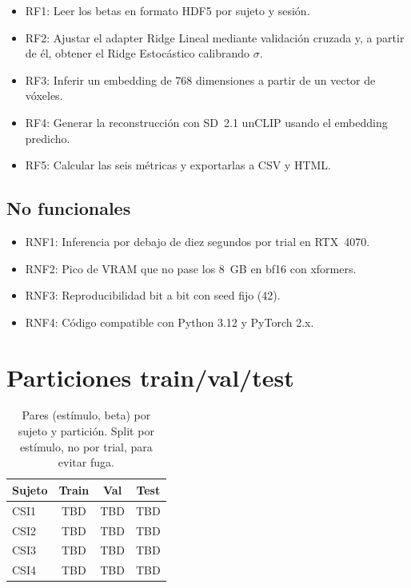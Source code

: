 \begin{itemize}
\item[•] RF1: Leer los betas en formato HDF5 por sujeto y sesión.
\item[•] RF2: Ajustar el adapter Ridge Lineal mediante validación cruzada y, a partir de él, obtener el Ridge Estocástico calibrando $\sigma$.
\item[•] RF3: Inferir un embedding de 768 dimensiones a partir de un vector de vóxeles.
\item[•] RF4: Generar la reconstrucción con SD~2.1 unCLIP usando el embedding predicho.
\item[•] RF5: Calcular las seis métricas y exportarlas a CSV y HTML.
\end{itemize}

\subsection{No funcionales}

\begin{itemize}
\item[•] RNF1: Inferencia por debajo de diez segundos por trial en RTX~4070.
\item[•] RNF2: Pico de VRAM que no pase los 8~GB en bf16 con xformers.
\item[•] RNF3: Reproducibilidad bit a bit con seed fijo (42).
\item[•] RNF4: Código compatible con Python 3.12 y PyTorch 2.x.
\end{itemize}

\section{Particiones train/val/test}

\begin{table}[H]
\centering
\begin{tabular}{| l | c | c | c |}
\hline
\textbf{Sujeto} & \textbf{Train} & \textbf{Val} & \textbf{Test} \\ \hline
CSI1 & TBD & TBD & TBD \\ \hline
CSI2 & TBD & TBD & TBD \\ \hline
CSI3 & TBD & TBD & TBD \\ \hline
CSI4 & TBD & TBD & TBD \\ \hline
\end{tabular}
\caption[Particiones BOLD5000]{Pares (estímulo, beta) por sujeto y partición. Split por estímulo, no por trial, para evitar fuga.}
\label{table:bold5000_splits}
\end{table}

\afterpage{\blankpage}
